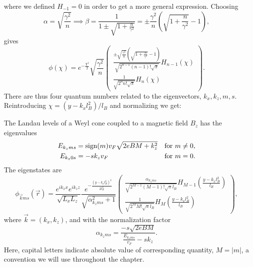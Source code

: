 where we defined \( H_{-1} = 0 \) in order to get a more general expression.
Choosing
\begin{equation}
  \alpha  = \sqrt{\frac{\gamma^2}{n}} \implies \beta = \frac{1}{1 \pm \sqrt{1 + \frac{n}{\gamma ^2}}} = \pm \frac{\gamma ^2}{n} \left( \sqrt{1 + \frac{n}{\gamma ^2}} - 1 \right),
\end{equation}
gives
\begin{equation}
  \phi (\chi ) = e^{-\frac{\chi^2}{2}} \sqrt{\frac{\gamma ^2}{n}}
  \begin{pmatrix}
    \frac{
      \pm \sqrt{\frac{\gamma ^2}{n}} \left( \sqrt{1 + \frac{n}{\gamma ^2}} - 1 \right)
    }{
      \sqrt{2^{n-1} (n-1)! \sqrt{\pi }}
    }
    H_{n-1}(\chi )\\
    \frac{1}{\sqrt{2^{n}n!\sqrt{\pi }}} H_n \left(\chi \right)
  \end{pmatrix}.
\end{equation}
There are thus four quantum numbers related to the eigenvectors, $k_x,  k_z, m, s$.
Reintroducing $\chi = (y-k_xl_B^2) /l_B$ and normalizing we get:
\begin{summary}\label{summary:ll-notilt}
  The Landau levels of a Weyl cone coupled to a magnetic field \( B_z \) has the eigenvalues
  \begin{subequations}
    \begin{align}
      E_{k_z m s} &= \operatorname{sign}(m) v_F \sqrt{2 e B M + k_{z} ^2} &\text{for } m \neq 0,\\
      E_{k_z 0 s} &= - sk_z v_F &\text{for } m = 0.
    \end{align}
  \end{subequations}
  The eigenstates are
  \begin{equation}
    \phi _{\vec{k} m s}(\vec{r}) =
    \frac{e^{ik_x x}e^{ik_z z}}{\sqrt{L_xL_z}}
    \frac{e^{-\frac{\left(y-k_x l_B^2\right)^2}{2 l_B^2}}}{\sqrt{\alpha_{k_z m s}^2 + 1}}
    \begin{pmatrix}
      \frac{\alpha_{k_z m s}}{\sqrt{2^{M-1} (M-1)! \sqrt{\pi } l_B}} H_{M-1}\left( \frac{y-k_x l_B^2}{l_B} \right)\\
      \frac{1}{\sqrt{2^M M! \sqrt{\pi } l_B}} H_M \left( \frac{y-k_x l_B^2}{l_B} \right)
    \end{pmatrix},
  \end{equation}
  where \( \vec{k} = (k_x, k_z)\), and with the normalization factor
  \begin{equation}
    \alpha_{k_z m s} = \frac{-s \sqrt{2eB M}}{\frac{E_{k_z m s}}{v_{F}} - s k_z}.
  \end{equation}
  Here, capital letters indicate absolute value of corresponding quantity, \( M=|m| \), a convention we will use throughout the chapter.
\end{summary}
